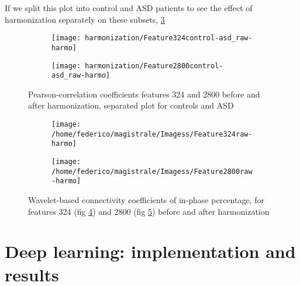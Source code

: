 \documentclass[12pt]{report}
\begin{document}
 If we split this plot into control and ASD patients to see the effect of harmonization separately on these subsets, \ref{fig:features_control-asd_raw-harmo}

 \begin{figure}
 \centering
 \begin{subfigure}[b]{1.\textwidth}
    \texttt{[image: harmonization/Feature324control-asd\_raw-harmo]}
    \caption{}
    \label{fig:feature324-control-asd}
 \end{subfigure}
 \begin{subfigure}[b]{1.\textwidth}
    \texttt{[image: harmonization/Feature2800control-asd\_raw-harmo]}
    \caption{}
    \label{fig:feature2800control-asd}
 \end{subfigure}
 \caption{Pearson-correlation coefficients features 324 and 2800 before and after harmonization, separated plot for controls and ASD}
 \label{fig:features_control-asd_raw-harmo}
 \end{figure}



 \begin{figure}
 \centering
 \begin{subfigure}[b]{1.\textwidth}
    \texttt{[image: /home/federico/magistrale/Imagess/Feature324raw-harmo]}
    \caption{}
    \label{fig:wavelet_feature324}
 \end{subfigure}
 \begin{subfigure}[b]{1.\textwidth}
    \texttt{[image: /home/federico/magistrale/Imagess/Feature2800raw-harmo]}
    \caption{}
    \label{fig:wavelet_feature2800}
 \end{subfigure}
 \caption{Wavelet-based connectivity coefficients of in-phase percentage, for features 324 (fig \ref{fig:wavelet_feature324}) and 2800 (fig \ref{fig:wavelet_feature2800}) before and after harmonization}
 \label{fig:wavelet_features_raw-harmo}
 \end{figure}

\newpage
\chapter{Deep learning: implementation and results} \label{sec:deep_learning_results}
\end{document}

